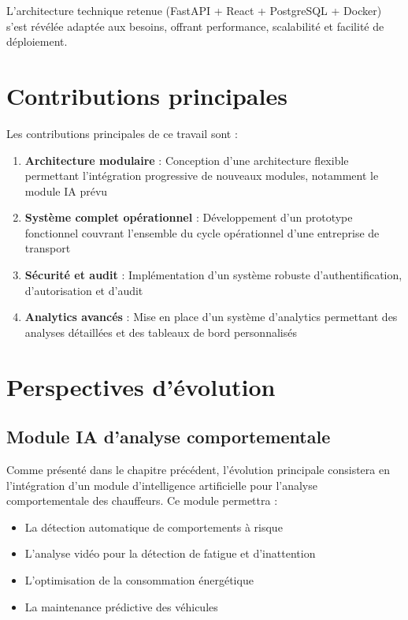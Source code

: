 \documentclass[a4paper, 12pt]{book}
\begin{document}
L'architecture technique retenue (FastAPI + React + PostgreSQL + Docker) s'est révélée adaptée aux besoins, offrant performance, scalabilité et facilité de déploiement.

\section{Contributions principales}

Les contributions principales de ce travail sont :

\begin{enumerate}
    \item \textbf{Architecture modulaire} : Conception d'une architecture flexible permettant l'intégration progressive de nouveaux modules, notamment le module IA prévu
    \item \textbf{Système complet opérationnel} : Développement d'un prototype fonctionnel couvrant l'ensemble du cycle opérationnel d'une entreprise de transport
    \item \textbf{Sécurité et audit} : Implémentation d'un système robuste d'authentification, d'autorisation et d'audit
    \item \textbf{Analytics avancés} : Mise en place d'un système d'analytics permettant des analyses détaillées et des tableaux de bord personnalisés
\end{enumerate}

\section{Perspectives d'évolution}

\subsection{Module IA d'analyse comportementale}

Comme présenté dans le chapitre précédent, l'évolution principale consistera en l'intégration d'un module d'intelligence artificielle pour l'analyse comportementale des chauffeurs. Ce module permettra :

\begin{itemize}
    \item La détection automatique de comportements à risque
    \item L'analyse vidéo pour la détection de fatigue et d'inattention
    \item L'optimisation de la consommation énergétique
    \item La maintenance prédictive des véhicules
\end{itemize}
\end{document}
